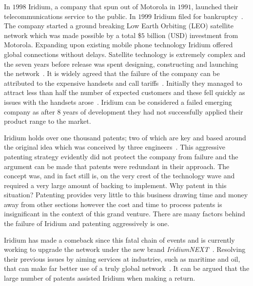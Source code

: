 {}

In $1998$ Iridium, a company that spun out of Motorola in $1991$, launched their telecommunications service to the public.
In $1999$ Iridium filed for bankruptcy~\cite{fink2000iridium}.   %
The company started a ground breaking Low Earth Orbiting (LEO) satellite network which was made possible by a total \$$5$ billion (USD) investment from Motorola.
Expanding upon existing mobile phone technology Iridium offered global connections without delays.
Satellite technology is extremely complex and the seven years before release was spent designing, constructing and launching the network~\cite{fink2000iridium}. 
It is widely agreed that the failure of the company can be attributed to the expensive handsets and call tariffs~\cite{fink2000iridium}.
Initially they managed to attract less than half the number of expected customers and these fell quickly as issues with the handsets arose~\cite{bill1999}.
Iridium can be considered a failed emerging company as after $8$ years of development they had not successfully applied their product range to the market.

Iridium holds over one thousand patents; two of which are key and based around the original idea which was conceived by three engineers~\cite{ip2010,bertiger1995satellite,bertiger1997satellite}.
This aggressive patenting strategy evidently did not protect the company from failure and the argument can be made that patents were redundant in their approach.
The concept was, and in fact still is, on the very crest of the technology wave and required a very large amount of backing to implement.
Why patent in this situation?
Patenting provides very little to this business drawing time and money away from other sections however the cost and time to process patents is insignificant in the context of this grand venture.
There are many factors behind the failure of Iridium and patenting aggressively is one. 

Iridium has made a comeback since this fatal chain of events and is currently working to upgrade the network under the new brand \emph{IridiumNEXT}~\cite{iridiumNEXT}.
Resolving their previous issues by aiming services at industries, such as maritime and oil, that can make far better use of a truly global network~\cite{better2009}.
It can be argued that the large number of patents assisted Iridium when making a return.  

